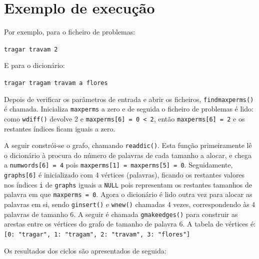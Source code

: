\documentclass[a4paper, 18pt]{article}
\begin{document}
\section{Exemplo de execução}
	\par
	Por exemplo, para o ficheiro de problemas:
	\begin{center}
		\texttt{tragar travam 2}
	\end{center}
	\par
	E para o dicionário:
	\begin{center}
		\texttt{tragar tragam travam a flores}
	\end{center}
	\par
	Depois de verificar os parâmetros de entrada e abrir os ficheiros, \texttt{find\textunderscore max\textunderscore perms()} é chamada.
	Inicializa \texttt{max\textunderscore perms} a zero e de seguida o ficheiro de problemas é lido: como \texttt{w\textunderscore diff()} devolve 2 e \texttt{max\textunderscore perms[6] = 0 < 2}, então \texttt{max\textunderscore perms[6] = 2} e os restantes índices ficam iguais a zero.
	\par
	A seguir constrói-se o grafo, chamando \texttt{read\textunderscore dic()}. Esta função primeiramente lê o dicionário à procura do número de palavras de cada tamanho a alocar, e chega a \texttt{num\textunderscore words[6] = 4} pois \texttt{max\textunderscore perms[1] = max\textunderscore perms[5] = 0}. Seguidamente, \texttt{graphs[6]} é inicializado com 4 vértices (palavras), ficando os restantes valores nos índices \texttt{i} de \texttt{graphs} iguais a \texttt{NULL} pois representam os restantes tamanhos de palavra em que \texttt{max\textunderscore perms = 0}. Agora o dicionário é lido outra vez para alocar as palavras em si, sendo \texttt{g\textunderscore insert()} e \texttt{w\textunderscore new()} chamadas 4 vezes, correspondendo às 4 palavras de tamanho 6. A seguir é chamada \texttt{g\textunderscore make\textunderscore edges()} para construir as arestas entre os vértices do grafo de tamanho de palavra 6. A tabela de vértices é:
	\texttt{[0: "tragar", 1: "tragam", 2: "travam", 3: "flores"]}
	\par
	Os resultados dos ciclos são apresentados de seguida:
\end{document}
